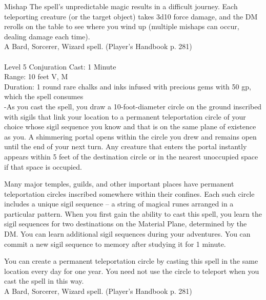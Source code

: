 \documentclass[10pt,twocolumn]{report}
\begin{document}
Mishap
The spell's unpredictable magic results in a difficult journey. Each teleporting creature (or the target object) takes 3d10 force damage, and the DM rerolls on the table to see where you wind up (multiple mishaps can occur, dealing damage each time).\\
A Bard, Sorcerer, Wizard spell. (Player's Handbook p. 281) \\


 \\
Level 5 \quad Conjuration \quad Cast: 1 Minute\\
Range: 10 feet \quad V, M\\
Duration: 1 round \quad rare chalks and inks infused with precious gems with 50 gp, which the spell consumes\\
-As you cast the spell, you draw a 10-foot-diameter circle on the ground inscribed with sigils that link your location to a permanent teleportation circle of your choice whose sigil sequence you know and that is on the same plane of existence as you.
A shimmering portal opens within the circle you drew and remains open until the end of your next turn. Any creature that enters the portal instantly appears within 5 feet of the destination circle or in the nearest unoccupied space if that space is occupied.

Many major temples, guilds, and other important places have permanent teleportation circles inscribed somewhere within their confines. Each such circle includes a unique sigil sequence – a string of magical runes arranged in a particular pattern. When you first gain the ability to cast this spell, you learn the sigil sequences for two destinations on the Material Plane, determined by the DM. You can learn additional sigil sequences during your adventures. You can commit a new sigil sequence to memory after studying it for 1 minute.

You can create a permanent teleportation circle by casting this spell in the same location every day for one year. You need not use the circle to teleport when you cast the spell in this way.\\
A Bard, Sorcerer, Wizard spell. (Player's Handbook p. 281) \\
\end{document}

